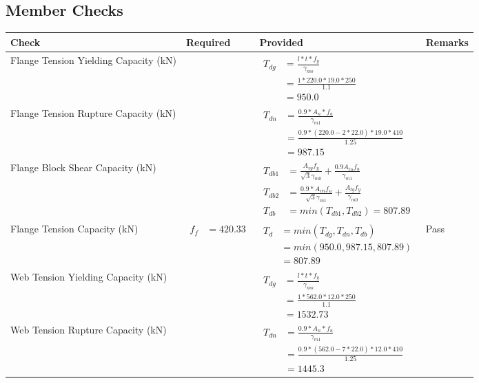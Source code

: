 \documentclass{article}%
\begin{document}
\subsection{Member Checks}%
\label{subsec:MemberChecks}%
\renewcommand{\arraystretch}{1.2}%
\begin{longtable}{|p{4cm}|p{6cm}|p{5.5cm}|p{1.5cm}|}%
\hline%
\rowcolor{OsdagGreen}%
Check&Required&Provided&Remarks\\%
\hline%
\endhead%
\hline%
Flange Tension Yielding Capacity (kN)&&$\begin{aligned} T_{dg} &= \frac{l*t*f_y}{\gamma_{mo}}\\ &=\frac{1*220.0*19.0*250}{1.1}\\ &=950.0\end{aligned}$&\\%
\hline%
Flange Tension Rupture Capacity (kN)&&$\begin{aligned} T_{dn} &= \frac{0.9*A_{n}*f_u}{\gamma_{m1}}\\ &=\frac{0.9*(220.0-2*22.0)*19.0*410}{1.25}\\ &=987.15\end{aligned}$&\\%
\hline%
Flange Block Shear Capacity (kN)&&$\begin{aligned}T_{db1} &= \frac{A_{vg} f_{y}}{\sqrt{3} \gamma_{m0}} + \frac{0.9 A_{tn} f_{u}}{\gamma_{m1}}\\ T_{db2} &= \frac{0.9*A_{vn} f_{u}}{\sqrt{3} \gamma_{m1}} + \frac{A_{tg} f_{y}}{\gamma_{m0}}\\ T_{db} &= min(T_{db1}, T_{db2})= 807.89\end{aligned}$&\\%
\hline%
Flange Tension Capacity (kN)&$\begin{aligned} f_f &=420.33\end{aligned}$&$\begin{aligned} T_d &= min(T_{dg},T_{dn},T_{db})\\ &= min(950.0,987.15,807.89)\\ &=807.89\end{aligned}$&Pass\\%
\hline%
Web Tension Yielding Capacity (kN)&&$\begin{aligned} T_{dg} &= \frac{l*t*f_y}{\gamma_{mo}}\\ &=\frac{1*562.0*12.0*250}{1.1}\\ &=1532.73\end{aligned}$&\\%
\hline%
Web Tension Rupture Capacity (kN)&&$\begin{aligned} T_{dn} &= \frac{0.9*A_{n}*f_u}{\gamma_{m1}}\\ &=\frac{0.9*(562.0-7*22.0)*12.0*410}{1.25}\\ &=1445.3\end{aligned}$&\\%

\end{longtable}
\end{document}
